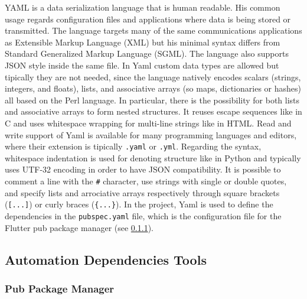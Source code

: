YAML is a data serialization language that is human readable. His common usage regards configuration files and applications where data is being stored or transmitted. The language targets many of the same communications applications as Extensible Markup Language (XML) but his minimal syntax differs from Standard Generalized Markup Language (SGML). The language also supports JSON style inside the same file. In Yaml custom data types are allowed but tipically they are not needed, since the language natively encodes scalars (strings, integers, and floats), lists, and associative arrays (so maps, dictionaries or hashes) all based on the Perl language. In particular, there is the possibility for both lists and associative arrays to form nested structures. It reuses escape sequences like in C and uses whitespace wrapping for multi-line strings like in HTML. Read and write support of Yaml is available for many programming languages and editors, where their extension is tipically \texttt{.yaml} or \texttt{.yml}. Regarding the syntax, whitespace indentation is used for denoting structure like in Python and typically uses UTF-32 encoding in order to have JSON compatibility. It is possible to comment a line with the \texttt{\#} character, use strings with single or double quotes, and specify lists and arrociative arrays respectively through square brackets (\texttt{[...]}) or curly braces (\texttt{\{...\}})\cite{Yaml}. In the project, Yaml is used to define the dependencies in the \texttt{pubspec.yaml} file, which is the configuration file for the Flutter pub package manager (see \cref{subsubsec:pub}).

\newpage
\subsection{Automation Dependencies Tools}

\subsubsection{Pub Package Manager}
\label{subsubsec:pub}


